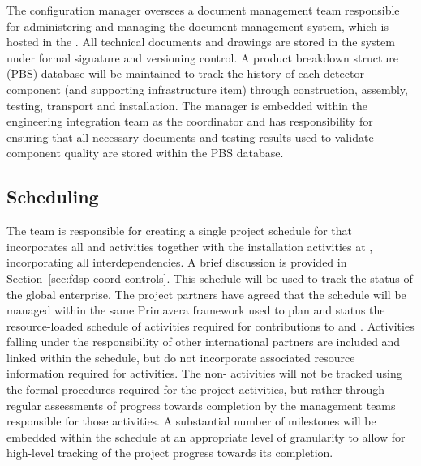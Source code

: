 The configuration manager oversees a document management team
responsible for %
administering and managing the 
document management system, which is hosted in the .  
All technical documents and drawings are stored in the  system
under formal signature and versioning control.  A product breakdown 
structure (PBS) database will be maintained to track the history of
each detector component (and supporting infrastructure item) through
construction, assembly, testing, transport and installation.  The
  manager is embedded within the
 engineering integration team as the  coordinator
and has responsibility for ensuring that all necessary documents and
testing results used to validate component quality are stored within
the PBS database.


\subsection{Scheduling}
\label{sec:dune_schedule}

The  team is responsible for creating a single project
schedule for  that incorporates all  and
 activities together with the installation activities at
, incorporating all interdependencies. A brief discussion
is provided in Section~\ref{sec:fdsp-coord-controls}. This schedule
will be used to track the status of the global enterprise.  The
project partners have agreed that the  schedule 
will be managed within the same Primavera  framework used 
to plan and status the resource-loaded schedule of activities required 
for   contributions to  and .
Activities falling under the responsibility of other international
partners are included and linked within the  schedule, but 
do not incorporate associated resource information required for  
 activities.  The non- activities will not be 
tracked using the formal  procedures required for the 
 project activities, but rather through regular assessments 
of progress towards completion by the management teams responsible 
for those activities.  A substantial number of milestones will be 
embedded within the schedule at an appropriate level of granularity 
to allow for high-level tracking of the project progress towards its 
completion.

